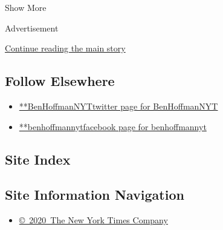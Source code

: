 Show More

Advertisement

\protect\hyperlink{after-mid2}{Continue reading the main story}

\hypertarget{follow-elsewhere}{%
\subsection{Follow Elsewhere}\label{follow-elsewhere}}

\begin{itemize}
\tightlist
\item
  \href{https://twitter.com/BenHoffmanNYT}{**BenHoffmanNYTtwitter page
  for BenHoffmanNYT}
\item
  \href{https://www.facebookcorewwwi.onion/benhoffmannyt}{**benhoffmannytfacebook
  page for benhoffmannyt}
\end{itemize}

\hypertarget{site-index}{%
\subsection{Site Index}\label{site-index}}

\hypertarget{site-information-navigation}{%
\subsection{Site Information
Navigation}\label{site-information-navigation}}

\begin{itemize}
\tightlist
\item
  \href{https://help.nytimes3xbfgragh.onion/hc/en-us/articles/115014792127-Copyright-notice}{©~2020~The
  New York Times Company}
\end{itemize}

